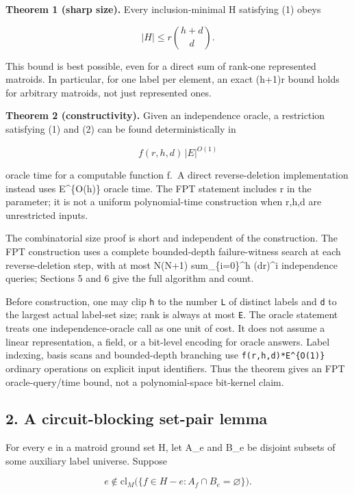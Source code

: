 \textbf{Theorem 1 (sharp size).} Every inclusion-minimal H satisfying (1) obeys

\[
\boxed{|H|\le r\binom{h+d}{d}.} \tag{2}
\]

This bound is best possible, even for a direct sum of rank-one represented matroids. In particular, for one label per element, an exact (h+1)r bound holds for arbitrary matroids, not just represented ones.

\textbf{Theorem 2 (constructivity).} Given an independence oracle, a restriction satisfying (1) and (2) can be found deterministically in

\[
f(r,h,d)\,|E|^{O(1)}
\]

oracle time for a computable function f.~A direct reverse-deletion implementation instead uses \textbar E\textbar\^{}\{O(h)\} oracle time. The FPT statement includes r in the parameter; it is not a uniform polynomial-time construction when r,h,d are unrestricted inputs.

The combinatorial size proof is short and independent of the construction. The FPT construction uses a complete bounded-depth failure-witness search at each reverse-deletion step, with at most N(N+1) sum\_\{i=0\}\^{}h (dr)\^{}i independence queries; Sections 5 and 6 give the full algorithm and count.

Before construction, one may clip \texttt{h} to the number \texttt{L} of distinct labels and \texttt{d} to the largest actual label-set size; rank is always at most \texttt{\textbar{}E\textbar{}}. The oracle statement treats one independence-oracle call as one unit of cost. It does not assume a linear representation, a field, or a bit-level encoding for oracle answers. Label indexing, basis scans and bounded-depth branching use \texttt{f(r,h,d)*\textbar{}E\textbar{}\^{}\{O(1)\}} ordinary operations on explicit input identifiers. Thus the theorem gives an FPT oracle-query/time bound, not a polynomial-space bit-kernel claim.

\hypertarget{af-4c0863a692-a-circuit-blocking-set-pair-lemma}{%
\subsection{2. A circuit-blocking set-pair lemma}\label{af-4c0863a692-a-circuit-blocking-set-pair-lemma}}

For every e in a matroid ground set H, let A\_e and B\_e be disjoint subsets of some auxiliary label universe. Suppose

\[
e\notin\mathrm{cl}_M\bigl(\{f\in H-e:A_f\cap B_e=\varnothing\}\bigr). \tag{3}
\]

